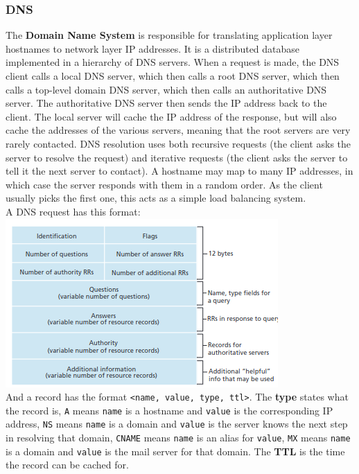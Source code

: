 \subsubsection{DNS}
The \textbf{Domain Name System} is responsible for translating application layer hostnames to network layer IP addresses. It is a distributed database implemented in a hierarchy of DNS servers. When a request is made, the DNS client calls a local DNS server, which then calls a root DNS server, which then calls a top-level domain DNS server, which then calls an authoritative DNS server. The authoritative DNS server then sends the IP address back to the client. The local server will cache the IP address of the response, but will also cache the addresses of the various servers, meaning that the root servers are very rarely contacted. DNS resolution uses both recursive requests (the client asks the server to resolve the request) and iterative requests (the client asks the server to tell it the next server to contact). A hostname may map to many IP addresses, in which case the server responds with them in a random order. As the client usually picks the first one, this acts as a simple load balancing system.\\
A DNS request has this format:
\includegraphics[width=\linewidth]{../images/w3n7dnsMessage.png}\\
And a record has the format \verb|<name, value, type, ttl>|. The \textbf{type} states what the record is, \verb|A| means \verb|name| is a hostname and \verb|value| is the corresponding IP address, \verb|NS| means \verb|name| is a domain and \verb|value| is the server knows the next step in resolving that domain, \verb|CNAME| means \verb|name| is an alias for \verb|value|, \verb|MX| means \verb|name| is a domain and \verb|value| is the mail server for that domain. The \textbf{TTL} is the time the record can be cached for.\\

